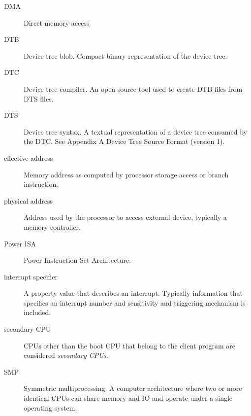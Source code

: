 \documentclass[a4paper,10pt,oneside]{sphinxmanual}
\begin{document}
\begin{description}
\item[{DMA}] \leavevmode{}\label{introduction:term-dma}
Direct memory access

\item[{DTB}] \leavevmode{}\label{introduction:term-dtb}
Device tree blob. Compact binary representation of the device tree.

\item[{DTC}] \leavevmode{}\label{introduction:term-dtc}
Device tree compiler. An open source tool used to create DTB files
from DTS files.

\item[{DTS}] \leavevmode{}\label{introduction:term-dts}
Device tree syntax. A textual representation of a device tree
consumed by the DTC. See Appendix A Device Tree Source Format
(version 1).

\item[{effective address}] \leavevmode{}\label{introduction:term-effective-address}
Memory address as computed by processor storage access or branch
instruction.

\item[{physical address}] \leavevmode{}\label{introduction:term-physical-address}
Address used by the processor to access external device, typically a
memory controller.

\item[{Power ISA}] \leavevmode{}\label{introduction:term-power-isa}
Power Instruction Set Architecture.

\item[{interrupt specifier}] \leavevmode{}\label{introduction:term-interrupt-specifier}
A property value that describes an interrupt. Typically information
that specifies an interrupt number and sensitivity and triggering
mechanism is included.

\item[{secondary CPU}] \leavevmode{}\label{introduction:term-secondary-cpu}
CPUs other than the boot CPU that belong to the client program are
considered \emph{secondary CPUs}.

\item[{SMP}] \leavevmode{}\label{introduction:term-smp}
Symmetric multiprocessing. A computer architecture where two or more
identical CPUs can share memory and IO and operate under a single operating
system.


\end{description}
\end{document}
